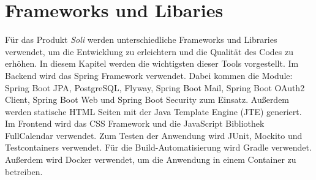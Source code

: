 \chapter{Frameworks und Libaries}
\label{ch:frameworks_libaries}

Für das Produkt \textit{Soli} werden unterschiedliche Frameworks und Libraries verwendet, um die Entwicklung zu erleichtern und die Qualität des Codes zu erhöhen. In diesem Kapitel werden die wichtigsten dieser Tools vorgestellt.
Im Backend wird das Spring Framework verwendet. Dabei kommen die Module: Spring Boot JPA, PostgreSQL, Flyway, Spring Boot Mail, Spring Boot OAuth2 Client, Spring Boot Web und Spring Boot Security zum Einsatz. Außerdem werden statische \gls{HTML} Seiten mit der Java Template Engine (JTE) generiert. Im Frontend wird das \gls{CSS} Framework und die JavaScript Bibliothek \gls{FullCalendar} verwendet.
Zum Testen der Anwendung wird JUnit, Mockito und Testcontainers verwendet.
Für die Build-Automatisierung wird Gradle verwendet.
Außerdem wird Docker verwendet, um die Anwendung in einem Container zu betreiben.